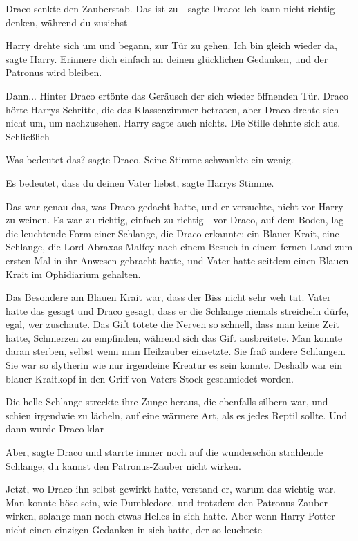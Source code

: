 Draco senkte den Zauberstab. \glqq{}Das ist zu -\grqq{} sagte Draco: \glqq{}Ich
kann nicht richtig denken, während du zusiehst -\grqq{}

Harry drehte sich um und begann, zur Tür zu gehen. \glqq{}Ich bin gleich wieder
da\grqq{}, sagte Harry. \glqq{}Erinnere dich einfach an deinen glücklichen
Gedanken, und der Patronus wird bleiben.\grqq{}

Dann... Hinter Draco ertönte das Geräusch der sich wieder öffnenden Tür. Draco
hörte Harrys Schritte, die das Klassenzimmer betraten, aber Draco drehte sich
nicht um, um nachzusehen. Harry sagte auch nichts. Die Stille dehnte sich aus.
Schließlich -

\glqq{}Was bedeutet das?\grqq{} sagte Draco. Seine Stimme schwankte ein wenig.

\glqq{}Es bedeutet, dass du deinen Vater liebst\grqq{}, sagte Harrys Stimme.

Das war genau das, was Draco gedacht hatte, und er versuchte, nicht vor Harry zu
weinen. Es war zu richtig, einfach zu richtig - vor Draco, auf dem Boden, lag
die leuchtende Form einer Schlange, die Draco erkannte; ein Blauer Krait, eine
Schlange, die Lord Abraxas Malfoy nach einem Besuch in einem fernen Land zum
ersten Mal in ihr Anwesen gebracht hatte, und Vater hatte seitdem einen Blauen
Krait im Ophidiarium gehalten.

Das Besondere am Blauen Krait war, dass der Biss nicht sehr weh tat. Vater hatte
das gesagt und Draco gesagt, dass er die Schlange niemals streicheln dürfe,
egal, wer zuschaute. Das Gift tötete die Nerven so schnell, dass man keine Zeit
hatte, Schmerzen zu empfinden, während sich das Gift ausbreitete. Man konnte
daran sterben, selbst wenn man Heilzauber einsetzte. Sie fraß andere Schlangen.
Sie war so slytherin wie nur irgendeine Kreatur es sein konnte. Deshalb war ein
blauer Kraitkopf in den Griff von Vaters Stock geschmiedet worden.

Die helle Schlange streckte ihre Zunge heraus, die ebenfalls silbern war, und
schien irgendwie zu lächeln, auf eine wärmere Art, als es jedes Reptil sollte.
Und dann wurde Draco klar -

\glqq{}Aber\grqq{}, sagte Draco und starrte immer noch auf die wunderschön
strahlende Schlange, \glqq{}du kannst den Patronus-Zauber nicht wirken.\grqq{}

Jetzt, wo Draco ihn selbst gewirkt hatte, verstand er, warum das wichtig war.
Man konnte böse sein, wie Dumbledore, und trotzdem den Patronus-Zauber wirken,
solange man noch etwas Helles in sich hatte. Aber wenn Harry Potter nicht einen
einzigen Gedanken in sich hatte, der so leuchtete -

